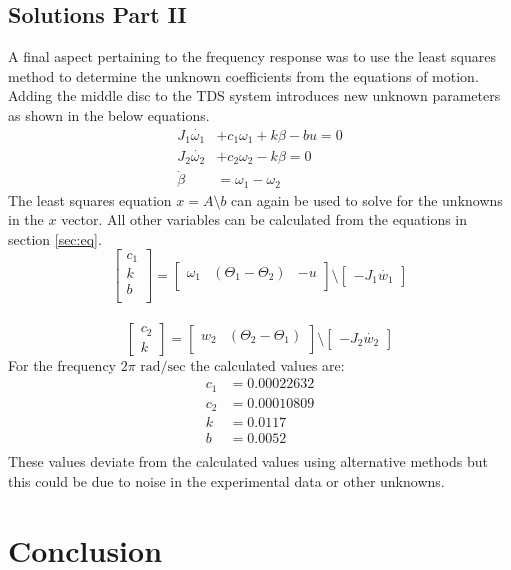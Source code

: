 \documentclass[11pt,titlepage]{article}
\begin{document}
	\subsection{Solutions Part II}
		A final aspect pertaining to the frequency response was to use the least squares method to determine the unknown coefficients from the equations of motion. Adding the middle disc to the TDS system introduces new unknown parameters as shown in the below equations.
		\begin{align}
			J_1\dot{\omega_1} &+ c_1\omega_1 + k\beta - bu = 0 \\
			J_2\dot{\omega_2} &+ c_2\omega_2 -k\beta = 0 \\
			\dot{\beta} &= \omega_1 - \omega_2
		\end{align}
		The least squares equation $x =A \setminus b$ can again be used to solve for the unknowns in the $x$ vector. All other variables can be calculated from the equations in section \ref{sec:eq}.
		\begin{equation}
			\begin{bmatrix}
				c_1 \\
				k \\
				b \\
			\end{bmatrix}
			=
			\begin{bmatrix}
				\omega_1 & (\Theta_1 - \Theta_2) & -u \\
			\end{bmatrix}
			\setminus
			\begin{bmatrix}
				-J_1\dot{w_1}
			\end{bmatrix}
		\end{equation}\\
		\begin{equation}
			\begin{bmatrix}
				c_2 \\
				k
			\end{bmatrix}
			=
			\begin{bmatrix}
				w_2 & (\Theta_2 - \Theta_1) \\
			\end{bmatrix}
			\setminus
			\begin{bmatrix}
				-J_2\dot{w_2}
			\end{bmatrix}
		\end{equation}
		For the frequency $2\pi \mbox{ rad/sec}$ the calculated values are:
		\begin{align*}
			c_1 &= 0.00022632 \\
			c_2 &= 0.00010809 \\
			k &= 0.0117 \\
			b &= 0.0052 \\
		\end{align*}
		These values deviate from the calculated values using alternative methods but this could be due to noise in the experimental data or other unknowns.

	\section{Conclusion}
\end{document}
